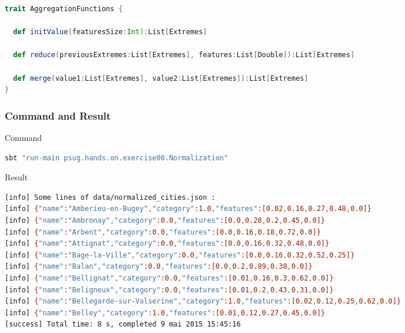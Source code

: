 \documentclass[slidetop,9pt,utf8]{beamer}
\begin{document}
\begin{CJK}{UTF8}{gbsn}
\begin{frame}[fragile]
\begin{lstlisting}[label=AggregationFunctionsTrait, caption=Aggregation Functions Trait, language=scala, style=code]
trait AggregationFunctions {

  def initValue(featuresSize:Int):List[Extremes]

  def reduce(previousExtremes:List[Extremes], features:List[Double]):List[Extremes]

  def merge(value1:List[Extremes], value2:List[Extremes]):List[Extremes]
}
\end{lstlisting}

\end{frame}

\begin{frame}[fragile]
  \frametitle{Command and Result}

  \begin{block}{Command}
    \begin{lstlisting}[language=bash, style=terminal-medium]
sbt "run-main psug.hands.on.exercise06.Normalization"  
    \end{lstlisting}
  \end{block}

  \begin{block}{Result}
    \begin{lstlisting}[language=bash, style=terminal]
[info] Some lines of data/normalized_cities.json : 
[info] {"name":"Amberieu-en-Bugey","category":1.0,"features":[0.02,0.16,0.27,0.48,0.0]}
[info] {"name":"Ambronay","category":0.0,"features":[0.0,0.28,0.2,0.45,0.0]}
[info] {"name":"Arbent","category":0.0,"features":[0.0,0.16,0.18,0.72,0.0]}
[info] {"name":"Attignat","category":0.0,"features":[0.0,0.16,0.32,0.48,0.0]}
[info] {"name":"Bage-la-Ville","category":0.0,"features":[0.0,0.16,0.32,0.52,0.25]}
[info] {"name":"Balan","category":0.0,"features":[0.0,0.2,0.89,0.38,0.0]}
[info] {"name":"Bellignat","category":0.0,"features":[0.01,0.16,0.3,0.62,0.0]}
[info] {"name":"Beligneux","category":0.0,"features":[0.01,0.2,0.43,0.31,0.0]}
[info] {"name":"Bellegarde-sur-Valserine","category":1.0,"features":[0.02,0.12,0.25,0.62,0.0]}
[info] {"name":"Belley","category":1.0,"features":[0.01,0.12,0.27,0.45,0.0]}
[success] Total time: 8 s, completed 9 mai 2015 15:45:16
    \end{lstlisting}
  \end{block}

\end{frame}

%
%
%
%


\end{CJK}
\end{document}
